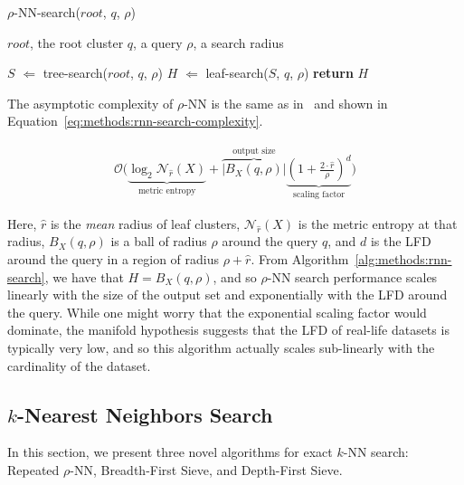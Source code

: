 \begin{algorithm} 
    \caption{$\rho$-NN-search($root$, $q$, $\rho$)} 
    \label{alg:methods:rnn-search} 
    \begin{algorithmic}
        \REQUIRE $root$, the root cluster
        \REQUIRE $q$, a query
        \REQUIRE $\rho$, a search radius

        \STATE $S$ $\Leftarrow$ tree-search($root$, $q$, $\rho$)
        \STATE $H$ $\Leftarrow$ leaf-search($S$, $q$, $\rho$)
        \STATE \textbf{return} $H$
    \end{algorithmic}
\end{algorithm}

The asymptotic complexity of $\rho$-NN is the same as in~\cite{ishaq2019clustered} and shown in Equation~\ref{eq:methods:rnn-search-complexity}.

\begin{gather}
    \mathcal{O}
    \Bigg(
        \underbrace{\log_2 \mathcal{N}_{\hat{r}}(X)}_{\textrm{metric entropy}} +
        \overbrace{ \left| B_X(q, \rho) \right|}^{\textrm{output size}}
        \underbrace{ \left( 1 + \frac{2 \cdot \hat{r}}{ \rho} \right) ^ d}_{\textrm{scaling factor}}
    \Bigg)
    \label{eq:methods:rnn-search-complexity}
\end{gather}

Here, $\hat{r}$ is the \textit{mean} radius of leaf clusters, $\mathcal{N}_{\hat{r}}(X)$ is the metric entropy at that radius, $B_X(q, \rho)$ is a ball of radius $\rho$ around the query $q$, and $d$ is the LFD around the query in a region of radius $\rho + \hat{r}$.
From Algorithm~\ref{alg:methods:rnn-search}, we have that $H = B_X(q, \rho)$, and so $\rho$-NN search performance scales linearly with the size of the output set and exponentially with the LFD around the query.
While one might worry that the exponential scaling factor would dominate, the manifold hypothesis suggests that the LFD of real-life datasets is typically very low, and so this algorithm actually scales sub-linearly with the cardinality of the dataset.


\subsection{\texorpdfstring{$k$}{k}-Nearest Neighbors Search}
\label{sec:methods:knn-search}

In this section, we present three novel algorithms for exact $k$-NN search:
Repeated $\rho$-NN, Breadth-First Sieve, and Depth-First Sieve.

